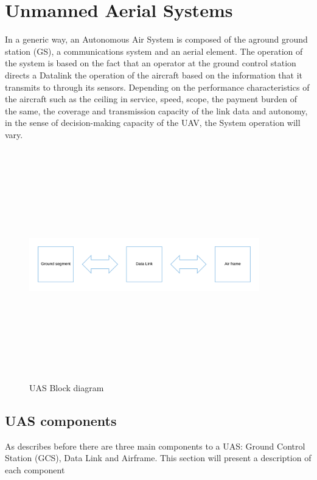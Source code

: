 \section{Unmanned Aerial Systems}
In a generic way, an Autonomous Air System is composed of the aground ground station (GS), a communications system and an aerial element. The operation of the system is based on the fact that an operator at the ground control station directs a Datalink the operation of the aircraft based on the information that it transmits to through its sensors. Depending on the performance characteristics of the aircraft such as the ceiling in service, speed, scope, the payment burden of the same, the coverage and transmission capacity of the link data and autonomy, in the sense of decision-making capacity of the UAV, the System operation will vary.\cite{Duran}
\begin{figure}[H]
\centering
\includegraphics[width=10cm,height=10cm,keepaspectratio]{imagenes/UAS_Components.png}
\caption{UAS Block diagram}
\label{fig:fixed-wing_UAS}
\end{figure}

\subsection{UAS components}
As describes before there are three main components to a UAS: Ground Control Station (GCS), Data Link and Airframe. This section will present a description of each component 
